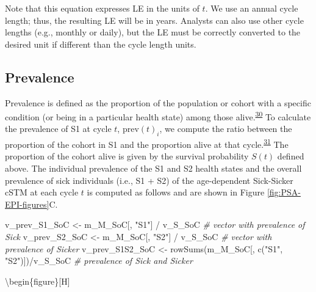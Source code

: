 \documentclass[
]{article}
\newenvironment{Shaded}{\begin{snugshade}}{\end{snugshade}}
\newcommand{\CommentTok}[1]{\textcolor[rgb]{0.56,0.35,0.01}{\textit{#1}}}
\newcommand{\FunctionTok}[1]{\textcolor[rgb]{0.00,0.00,0.00}{#1}}
\newcommand{\NormalTok}[1]{#1}
\newcommand{\OtherTok}[1]{\textcolor[rgb]{0.56,0.35,0.01}{#1}}
\newcommand{\SpecialCharTok}[1]{\textcolor[rgb]{0.00,0.00,0.00}{#1}}
\newcommand{\StringTok}[1]{\textcolor[rgb]{0.31,0.60,0.02}{#1}}
\begin{document}
Note that this equation expresses LE in the units of \(t\). We use an annual cycle length; thus, the resulting LE will be in years. Analysts can also use other cycle lengths (e.g., monthly or daily), but the LE must be correctly converted to the desired unit if different than the cycle length units.

\hypertarget{prevalence}{%
\subsection{Prevalence}\label{prevalence}}

Prevalence is defined as the proportion of the population or cohort with a specific condition (or being in a particular health state) among those alive.\textsuperscript{\protect\hyperlink{ref-Rothman2008h}{30}} To calculate the prevalence of S1 at cycle \(t\), \(\text{prev}(t)_i\), we compute the ratio between the proportion of the cohort in S1 and the proportion alive at that cycle.\textsuperscript{\protect\hyperlink{ref-Keiding1991}{31}} The proportion of the cohort alive is given by the survival probability \(S(t)\) defined above. The individual prevalence of the S1 and S2 health states and the overall prevalence of sick individuals (i.e., S1 + S2) of the age-dependent Sick-Sicker cSTM at each cycle \(t\) is computed as follows and are shown in Figure \ref{fig:PSA-EPI-figures}C.

\begin{Shaded}
\begin{Highlighting}[]
\NormalTok{v\_prev\_S1\_SoC   }\OtherTok{\textless{}{-}}\NormalTok{ m\_M\_SoC[, }\StringTok{"S1"}\NormalTok{] }\SpecialCharTok{/}\NormalTok{ v\_S\_SoC          }\CommentTok{\# vector with prevalence of Sick}
\NormalTok{v\_prev\_S2\_SoC   }\OtherTok{\textless{}{-}}\NormalTok{ m\_M\_SoC[, }\StringTok{"S2"}\NormalTok{] }\SpecialCharTok{/}\NormalTok{ v\_S\_SoC          }\CommentTok{\# vector with prevalence of Sicker}
\NormalTok{v\_prev\_S1S2\_SoC }\OtherTok{\textless{}{-}} \FunctionTok{rowSums}\NormalTok{(m\_M\_SoC[, }\FunctionTok{c}\NormalTok{(}\StringTok{"S1"}\NormalTok{, }\StringTok{"S2"}\NormalTok{)])}\SpecialCharTok{/}\NormalTok{v\_S\_SoC }\CommentTok{\# prevalence of Sick and Sicker}
\end{Highlighting}
\end{Shaded}

\textbackslash begin\{figure\}{[}H{]}
\end{document}
